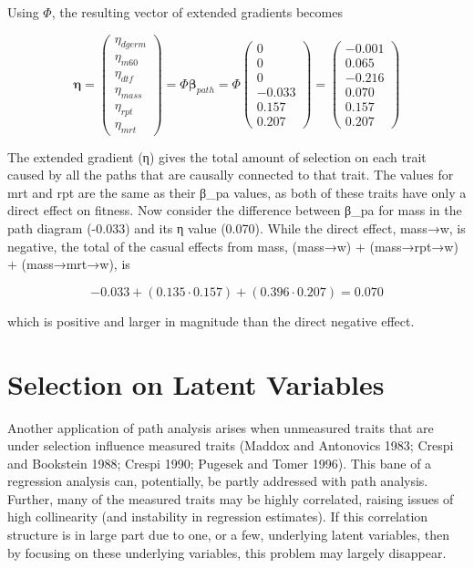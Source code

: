 \documentclass{article}
\begin{document}
Using  $ \Phi $, the resulting vector of extended gradients becomes

\begin{equation}
\boldsymbol{\eta}=\begin{pmatrix}\eta_{d g e r m}\\\eta_{m60}\\\eta_{d t f}\\\eta_{m a s s}\\\eta_{r p t}\\\eta_{m r t}\end{pmatrix}=\boldsymbol{\varPhi}\boldsymbol{\beta}_{p a t h}=\boldsymbol{\varPhi}\begin{pmatrix}0\\0\\0\\-0.033\\0.157\\0.207\end{pmatrix}=\begin{pmatrix}-0.001\\0.065\\-0.216\\0.070\\0.157\\0.207\end{pmatrix}
\end{equation}

The extended gradient (η) gives the total amount of selection on each trait caused by all the paths that are causally connected to that trait. The values for mrt and rpt are the same as their β_pa values, as both of these traits have only a direct effect on fitness. Now consider the difference between β_pa for mass in the path diagram (-0.033) and its η value (0.070). While the direct effect, mass→w, is negative, the total of the casual effects from mass, (mass→w) + (mass→rpt→w) + (mass→mrt→w), is

\begin{equation}
-0.033+(0.135\cdot0.157)+(0.396\cdot0.207)=0.070
\end{equation}

which is positive and larger in magnitude than the direct negative effect.

\section{Selection on Latent Variables}
Another application of path analysis arises when unmeasured traits that are under selection influence measured traits (Maddox and Antonovics 1983; Crespi and Bookstein 1988; Crespi 1990; Pugesek and Tomer 1996). This bane of a regression analysis can, potentially, be partly addressed with path analysis. Further, many of the measured traits may be highly correlated, raising issues of high collinearity (and instability in regression estimates). If this correlation structure is in large part due to one, or a few, underlying latent variables, then by focusing on these underlying variables, this problem may largely disappear.
\end{document}

